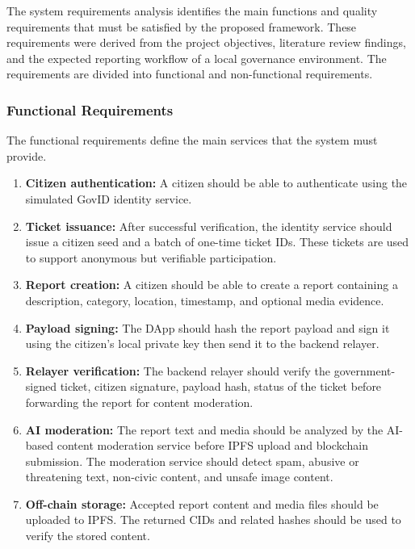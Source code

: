 The system requirements analysis identifies the main functions and quality 
requirements that must be satisfied by the proposed framework. These requirements 
were derived from the project objectives, literature review findings, and the expected 
reporting workflow of a local governance environment. The requirements are divided 
into functional and non-functional requirements.

\subsubsection{Functional Requirements}

The functional requirements define the main services that the system must provide.

\begin{enumerate}
    \item \textbf{Citizen authentication:}
    A citizen should be able to authenticate using the simulated GovID identity service.

    \item \textbf{Ticket issuance:}
    After successful verification, the identity service should issue a citizen seed and a 
    batch of one-time ticket IDs. These tickets are used to support anonymous but 
    verifiable participation.

    \item \textbf{Report creation:}
    A citizen should be able to create a report containing a description, category, 
    location, timestamp, and optional media evidence.

    \item \textbf{Payload signing:}
    The DApp should hash the report payload and sign it using the 
    citizen's local private key then send it to the backend relayer.

    \item \textbf{Relayer verification:}
    The backend relayer should verify the government-signed ticket, citizen signature, 
    payload hash, status of the ticket before forwarding the report for content moderation.

    \item \textbf{AI moderation:}
    The report text and media should be analyzed by the AI-based content moderation service before IPFS upload and blockchain submission. The moderation service should detect spam, abusive or threatening text, non-civic content, and unsafe image content.

    \item \textbf{Off-chain storage:}
    Accepted report content and media files should be uploaded to IPFS. The returned 
    CIDs and related hashes should be used to verify the stored content.


\end{enumerate}
